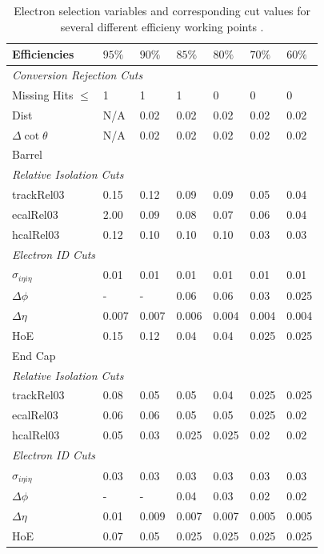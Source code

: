 \begin{table}[htbp]
  \begin{center}
    \begin{tabular}{lllllll} 
\toprule
Efficiencies& $95\%$& $90\%$& $85\%$& $80\%$& $70\%$& $60\%$\\
\midrule
\multicolumn{7}{l}{\emph{Conversion Rejection Cuts}}\\ 
Missing Hits $\leq$& 1& 1& 1& 0& 0& 0\\
Dist& N/A& 0.02& 0.02& 0.02& 0.02& 0.02\\
$\Delta\cot\theta$& N/A& 0.02& 0.02& 0.02& 0.02& 0.02\\
\midrule
\multicolumn{7}{l}{Barrel}\\ 
\multicolumn{7}{l}{\emph{Relative Isolation Cuts}} \\
trackRel03& 0.15& 0.12& 0.09& 0.09& 0.05& 0.04\\
ecalRel03& 2.00& 0.09& 0.08& 0.07& 0.06& 0.04\\
hcalRel03& 0.12& 0.10& 0.10& 0.10& 0.03& 0.03\\
\multicolumn{7}{l}{\emph{Electron ID Cuts}} \\
$\sigma_{i\eta i\eta}$& 0.01& 0.01& 0.01& 0.01& 0.01& 0.01\\
$\Delta \phi$& - & - & 0.06& 0.06& 0.03& 0.025\\
$\Delta \eta$& 0.007& 0.007& 0.006& 0.004& 0.004& 0.004\\
HoE& 0.15& 0.12& 0.04& 0.04& 0.025& 0.025\\
\midrule
\multicolumn{7}{l}{End Cap}\\ 
\multicolumn{7}{l}{\emph{Relative Isolation Cuts}} \\
trackRel03& 0.08& 0.05& 0.05& 0.04& 0.025& 0.025\\
ecalRel03& 0.06& 0.06& 0.05& 0.05& 0.025& 0.02\\
hcalRel03& 0.05& 0.03& 0.025& 0.025& 0.02& 0.02\\
\multicolumn{7}{l}{\emph{Electron ID Cuts}} \\
$\sigma_{i\eta i\eta}$& 0.03& 0.03& 0.03& 0.03& 0.03& 0.03\\
$\Delta \phi$& - & - & 0.04& 0.03& 0.02& 0.02\\
$\Delta \eta$& 0.01& 0.009& 0.007& 0.007& 0.005& 0.005\\
HoE& 0.07& 0.05& 0.025& 0.025& 0.025& 0.025\\
\bottomrule
    \end{tabular}
    \caption{Electron selection variables and
corresponding cut values for several different efficieny working points
\cite{twiki_electron}.}
  \end{center}
\label{tab:electronwp} 
\end{table}

